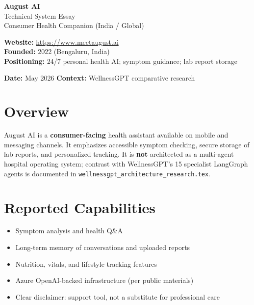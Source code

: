 \documentclass[12pt,a4paper]{article}
\begin{document}
\begin{titlepage}
\centering\vspace*{2cm}
{\Huge\bfseries\color{primaryblue} August AI}\\[0.5cm]
{\Large Technical System Essay}\\[0.3cm]
{\large Consumer Health Companion (India / Global)}\\[2cm]
\begin{mdframed}[backgroundcolor=lightgray,linecolor=primaryblue,linewidth=1.5pt]
\centering
\textbf{Website:} \url{https://www.meetaugust.ai}\\
\textbf{Founded:} 2022 (Bengaluru, India)\\
\textbf{Positioning:} 24/7 personal health AI; symptom guidance; lab report storage\\
\end{mdframed}
\vfill
\textbf{Date:} May 2026 \quad \textbf{Context:} WellnessGPT comparative research
\end{titlepage}

\section{Overview}
August AI is a \textbf{consumer-facing} health assistant available on mobile and messaging channels. It emphasizes accessible symptom checking, secure storage of lab reports, and personalized tracking. It is \textbf{not} architected as a multi-agent hospital operating system; contrast with WellnessGPT's 15 specialist LangGraph agents is documented in \texttt{wellnessgpt\_architecture\_research.tex}.

\section{Reported Capabilities}
\begin{itemize}
    \item Symptom analysis and health Q\&A
    \item Long-term memory of conversations and uploaded reports
    \item Nutrition, vitals, and lifestyle tracking features
    \item Azure OpenAI-backed infrastructure (per public materials)
    \item Clear disclaimer: support tool, not a substitute for professional care
\end{itemize}
\end{document}

